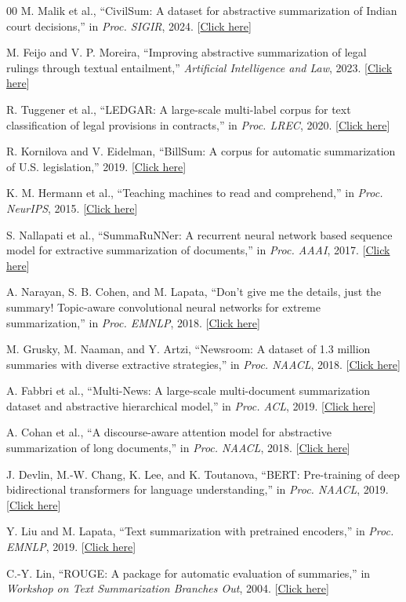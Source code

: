 \documentclass[11pt, a4paper]{article}
\theoremstyle{plain}%
\theoremstyle{remark}%
\theoremstyle{definition}%
\begin{document}
\begin{thebibliography}{00}
M. Malik et al.,
``CivilSum: A dataset for abstractive summarization of Indian court decisions,''
in \emph{Proc. SIGIR}, 2024.
[\href{https://doi.org/10.1145/3626772.3657859}{Click here}]

M. Feijo and V. P. Moreira,
``Improving abstractive summarization of legal rulings through textual entailment,''
\emph{Artificial Intelligence and Law}, 2023.
[\href{https://doi.org/10.1007/s10506-021-09305-4}{Click here}]

R. Tuggener et al.,
``LEDGAR: A large-scale multi-label corpus for text classification of legal provisions in contracts,''
in \emph{Proc. LREC}, 2020.
[\href{https://aclanthology.org/2020.lrec-1.155/}{Click here}]

R. Kornilova and V. Eidelman,
``BillSum: A corpus for automatic summarization of U.S. legislation,''
2019.
[\href{https://aclanthology.org/D19-5406/}{Click here}]

K. M. Hermann et al.,
``Teaching machines to read and comprehend,''
in \emph{Proc. NeurIPS}, 2015.
[\href{https://arxiv.org/abs/1506.03340}{Click here}]

S. Nallapati et al.,
``SummaRuNNer: A recurrent neural network based sequence model for extractive summarization of documents,''
in \emph{Proc. AAAI}, 2017.
[\href{https://arxiv.org/abs/1611.04230}{Click here}]

A. Narayan, S. B. Cohen, and M. Lapata,
``Don’t give me the details, just the summary! Topic-aware convolutional neural networks for extreme summarization,''
in \emph{Proc. EMNLP}, 2018.
[\href{https://aclanthology.org/D18-1206/}{Click here}]

M. Grusky, M. Naaman, and Y. Artzi,
``Newsroom: A dataset of 1.3 million summaries with diverse extractive strategies,''
in \emph{Proc. NAACL}, 2018.
[\href{https://aclanthology.org/N18-1065/}{Click here}]

A. Fabbri et al.,
``Multi-News: A large-scale multi-document summarization dataset and abstractive hierarchical model,''
in \emph{Proc. ACL}, 2019.
[\href{https://arxiv.org/abs/1906.01749}{Click here}]

A. Cohan et al.,
``A discourse-aware attention model for abstractive summarization of long documents,''
in \emph{Proc. NAACL}, 2018.
[\href{https://aclanthology.org/N18-2097/}{Click here}]

J. Devlin, M.-W. Chang, K. Lee, and K. Toutanova,
``BERT: Pre-training of deep bidirectional transformers for language understanding,''
in \emph{Proc. NAACL}, 2019.
[\href{https://arxiv.org/abs/1810.04805}{Click here}]

Y. Liu and M. Lapata,
``Text summarization with pretrained encoders,''
in \emph{Proc. EMNLP}, 2019.
[\href{https://aclanthology.org/D19-1387/}{Click here}]

C.-Y. Lin,
``ROUGE: A package for automatic evaluation of summaries,''
in \emph{Workshop on Text Summarization Branches Out}, 2004.
[\href{https://aclanthology.org/W04-1013.pdf}{Click here}]

\end{thebibliography}
\end{document}
